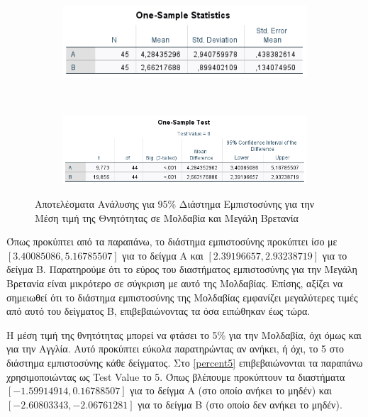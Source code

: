 \documentclass{article}
\begin{document}
    \begin{figure}[t]
      \centering
        \begin{subfigure}{0.8\linewidth}
        \centering
          \includegraphics[width=\linewidth]{media/2/one_sample_statistics.png}
        \end{subfigure}\\
        \begin{subfigure}{1\linewidth}
            \centering
          \includegraphics[width=\linewidth]{media/2/de.png}
        \end{subfigure}
      \caption{Αποτελέσματα Ανάλυσης για 95\% Διάστημα Εμπιστοσύνης για την Μέση τιμή της Θνητότητας σε Μολδαβία και Μεγάλη Βρετανία}
      \label{mean}
    \end{figure}

     Όπως προκύπτει από τα παραπάνω, το διάστημα εμπιστοσύνης προκύπτει ίσο με $ [3.40085086, 5.16785507] $ για το δείγμα Α και $ [2.39196657, 2.93238719] $ για το δείγμα Β. Παρατηρούμε ότι το εύρος του διαστήματος εμπιστοσύνης για την Μεγάλη Βρετανία είναι μικρότερο σε σύγκριση με αυτό της Μολδαβίας. Επίσης, αξίζει να σημειωθεί ότι το διάστημα εμπιστοσύνης της Μολδαβίας εμφανίζει μεγαλύτερες τιμές από αυτό του δείγματος Β, επιβεβαιώνοντας τα όσα ειπώθηκαν έως τώρα.
     
     Η μέση τιμή της θνητότητας μπορεί να φτάσει το 5\% για την Μολδαβία, όχι όμως και για την Αγγλία. Αυτό προκύπτει εύκολα παρατηρώντας αν ανήκει, ή όχι, το 5 στο διάστημα εμπιστοσύνης κάθε δείγματος. Στο \autoref{percent5} επιβεβαιώνονται τα παραπάνω χρησιμοποιώντας ως \foreignlanguage{english}{Test Value} το 5. Όπως βλέπουμε προκύπτουν τα διαστήματα  $ [-1.59914914, 0.16788507] $ για το δείγμα Α (στο οποίο ανήκει το μηδέν) και $ [-2.60803343, -2.06761281] $ για το δείγμα Β (στο οποίο δεν ανήκει το μηδέν).
     
\end{document}
